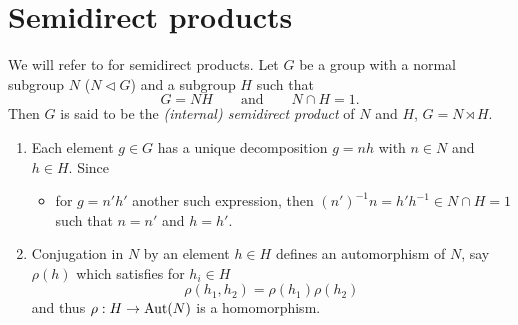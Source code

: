 \begin{comment}
\paragraph{Universal cover:}
\[
  \R\to S^1; \nu \mapsto e^{i\nu}
\]
\TODO{}

\paragraph{$q$-sheet cover:}
\[
  S^1\to S^1; \nu \mapsto \nu^q
\]
\TODO{}
\end{comment}

\section{Semidirect products}
\begin{comment}
  see
  \begin{itemize}
    \item \url{http://nlab.mathforge.org/nlab/show/semidirect+product+group}
    \item \url{http://en.wikipedia.org/wiki/Semidirect_product}
    \item \cite{Robinson2003An}
  \end{itemize}
\end{comment}
We will refer to \cite[75]{Robinson2003An} for semidirect products.
Let $G$ be a group with a normal subgroup $N$ ($N\vartriangleleft G$) and a
subgroup $H$ such that 
\[
  G=NH\qquad\text{and}\qquad N\cap H=1.
\]
Then $G$ is said to be the \emph{(internal) semidirect product} of $N$ and $H$,
$G=N\rtimes H$.
\begin{rem}
  \begin{enumerate}
    \item Each element $g\in G$ has a unique decomposition $g=nh$ with $n\in N$
      and $h\in H$. Since
      \begin{itemize}
        \item[] for $g=n'h'$ another such expression, then
          $(n')^{-1}n=h'h^{-1}\in N\cap H=1$ such that $n=n'$ and $h=h'$.
      \end{itemize}
    \item Conjugation in $N$ by an element $h\in H$ defines an automorphism of
      $N$, say $\rho(h)$ which satisfies for $h_i\in H$
      \[
        \rho(h_1,h_2)=\rho(h_1)\rho(h_2)
      \]
      and thus $\rho:H\to\operatorname{Aut}(N)$ is a homomorphism.
  \end{enumerate}
\end{rem}
